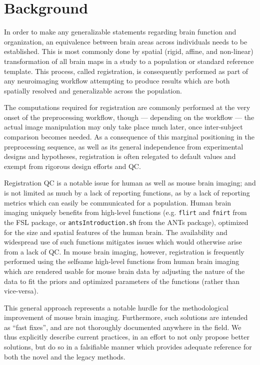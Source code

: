 \section{Background}
\label{sec:bg}

In order to make any generalizable statements regarding brain function and organization, an equivalence between brain areas across individuals needs to be established.
This is most commonly done by spatial (rigid, affine, and non-linear) transformation of all brain maps in a study to a population or standard reference template.
This process, called registration, is consequently performed as part of any neuroimaging workflow attempting to produce results which are both spatially resolved and generalizable across the population.

The computations required for registration are commonly performed at the very onset of the preprocessing workflow,
though --- depending on the workflow --- the actual image manipulation may only take place much later, once inter-subject comparison becomes needed.
As a consequence of this marginal positioning in the preprocessing sequence, as well as its general independence from experimental designs and hypotheses, registration is often relegated to default values and exempt from rigorous design efforts and QC.

Registration QC is a notable issue for human as well as mouse brain imaging;
and is not limited as much by a lack of reporting functions, as by a lack of reporting metrics which can easily be communicated for a population.
Human brain imaging uniquely benefits from high-level functions (e.g.  \textcolor{mg}{\texttt{flirt}} and  \textcolor{mg}{\texttt{fnirt}} from the FSL package\cite{fsl}, or \textcolor{mg}{\texttt{antsIntroduction.sh}} from the ANTs package\cite{ants}), optimized for the size and spatial features of the human brain.
The availability and widespread use of such functions mitigates issues which would otherwise arise from a lack of QC.
In mouse brain imaging, however, registration is frequently performed using the selfsame high-level functions from human brain imaging which are rendered usable for mouse brain data by adjusting the nature of the data to fit the priors and optimized parameters of the functions (rather than vice-versa).

This general approach represents a notable hurdle for the methodological improvement of mouse brain imaging.
Furthermore, such solutions are intended as “fast fixes”, and are not thoroughly documented anywhere in the field.
We thus explicitly describe current practices, in an effort to not only propose better solutions, but do so in a falsifiable manner which provides adequate reference for both the novel and the legacy methods.

